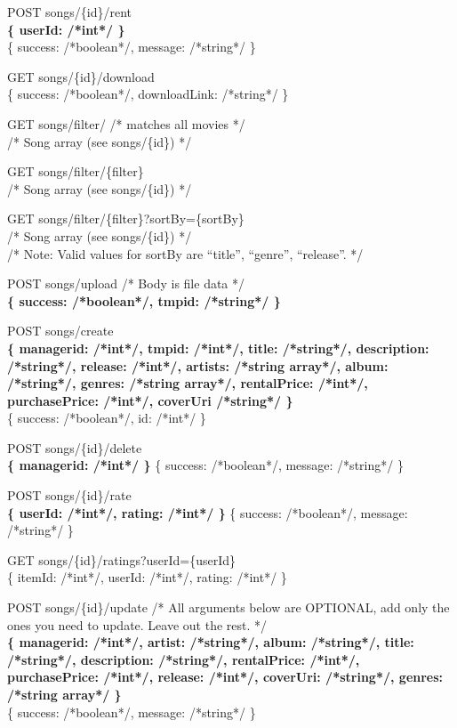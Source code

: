 POST songs/\{id\}/rent \\
\textbf{\{ userId: /*int*/ \}} \\
\{ success: /*boolean*/, message: /*string*/ \}

GET  songs/\{id\}/download \\
\{ success: /*boolean*/, downloadLink: /*string*/ \}

GET  songs/filter/ /* matches all movies */ \\
/* Song array (see songs/\{id\}) */

GET  songs/filter/\{filter\} \\
/* Song array (see songs/\{id\}) */

GET  songs/filter/\{filter\}?sortBy=\{sortBy\} \\
/* Song array (see songs/\{id\}) */ \\
/* Note: Valid values for sortBy are “title”, “genre”, “release”. */

POST songs/upload /* Body is file data */ \\
\textbf{\{ success: /*boolean*/, tmpid: /*string*/ \}}

POST songs/create \\
\textbf{\{ managerid: /*int*/, tmpid: /*int*/, title: /*string*/, description: /*string*/, release: /*int*/, artists: /*string array*/, album: /*string*/, genres: /*string array*/, rentalPrice: /*int*/, purchasePrice: /*int*/, coverUri /*string*/ \}} \\
\{ success: /*boolean*/, id: /*int*/ \}

POST songs/\{id\}/delete \\
\textbf{\{ managerid: /*int*/ \}}
\{ success: /*boolean*/, message: /*string*/ \}

POST songs/\{id\}/rate \\
\textbf{\{ userId: /*int*/, rating: /*int*/ \}}
\{ success: /*boolean*/, message: /*string*/ \}

GET songs/\{id\}/ratings?userId=\{userId\} \\
\{ itemId: /*int*/, userId: /*int*/, rating: /*int*/ \}

POST songs/\{id\}/update /* All arguments below are OPTIONAL, add only the ones you need to update. Leave out the rest. */ \\
\textbf{\{ managerid: /*int*/, artist: /*string*/, album: /*string*/, title: /*string*/, description: /*string*/, 
rentalPrice: /*int*/, purchasePrice: /*int*/, release: /*int*/, coverUri: /*string*/, genres: /*string array*/ \}} \\
\{ success: /*boolean*/, message: /*string*/ \}